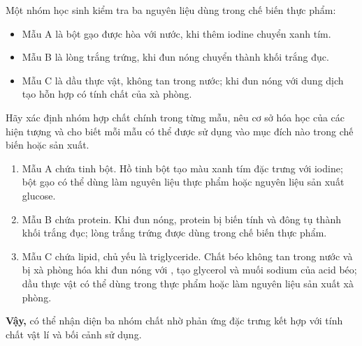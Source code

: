 \begin{tuluyen}
Một nhóm học sinh kiểm tra ba nguyên liệu dùng trong chế biến thực phẩm:
\begin{itemize}
\item Mẫu A là bột gạo được hòa với nước, khi thêm iodine chuyển xanh tím.
\item Mẫu B là lòng trắng trứng, khi đun nóng chuyển thành khối trắng đục.
\item Mẫu C là dầu thực vật, không tan trong nước; khi đun nóng với dung dịch  tạo hỗn hợp có tính chất của xà phòng.
\end{itemize}
Hãy xác định nhóm hợp chất chính trong từng mẫu, nêu cơ sở hóa học của các hiện tượng và cho biết mỗi mẫu có thể được sử dụng vào mục đích nào trong chế biến hoặc sản xuất.
\begin{loigiaiBT}
\begin{enumerate}
\item Mẫu A chứa tinh bột. Hồ tinh bột tạo màu xanh tím đặc trưng với iodine; bột gạo có thể dùng làm nguyên liệu thực phẩm hoặc nguyên liệu sản xuất glucose.
\item Mẫu B chứa protein. Khi đun nóng, protein bị biến tính và đông tụ thành khối trắng đục; lòng trắng trứng được dùng trong chế biến thực phẩm.
\item Mẫu C chứa lipid, chủ yếu là triglyceride. Chất béo không tan trong nước và bị xà phòng hóa khi đun nóng với , tạo glycerol và muối sodium của acid béo; dầu thực vật có thể dùng trong thực phẩm hoặc làm nguyên liệu sản xuất xà phòng.
\end{enumerate}

\textbf{Vậy,} có thể nhận diện ba nhóm chất nhờ phản ứng đặc trưng kết hợp với tính chất vật lí và bối cảnh sử dụng.
\end{loigiaiBT}
\end{tuluyen}
